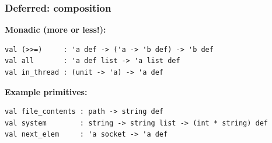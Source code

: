 \documentclass{beamer}
\begin{document}
% 
% 
%



\begin{frame}[fragile]
\frametitle{Deferred: composition}
{\bf Monadic (more or less!):}
{\footnotesize
\begin{verbatim}
val (>>=)     : 'a def -> ('a -> 'b def) -> 'b def
val all       : 'a def list -> 'a list def
val in_thread : (unit -> 'a) -> 'a def
\end{verbatim}}
{\bf Example primitives:}
{\footnotesize
\begin{verbatim}
val file_contents : path -> string def
val system        : string -> string list -> (int * string) def
val next_elem     : 'a socket -> 'a def
\end{verbatim}}
\end{frame}

%
% 
\end{document}

